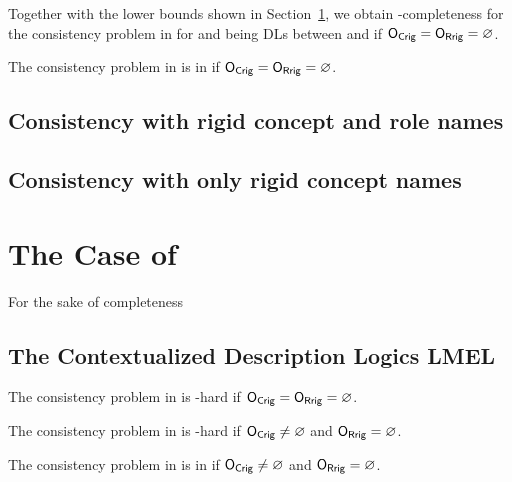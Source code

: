 Together with the lower bounds shown in Section~\ref{sec:case-el}, we obtain \ExpTime-completeness
for the consistency problem in \LMLO for \LM and \LO being DLs between \ALC and \SHOQ if
$\mathsf{O_{Crig}}=\mathsf{O_{Rrig}}=\varnothing$.

\begin{lemma}\label{lem:shoiqshoiq-without-rigid-exptime}
  The consistency problem in \SHOIQSHOIQ is in \NExpTime if $\mathsf{O_{Crig}}=\mathsf{O_{Rrig}}=\varnothing$.
\end{lemma}
\missingproof

\subsection{Consistency with rigid concept and role names}
\label{sec:cons-with-rigid}




\subsection{Consistency with only rigid concept names}
\label{sec:cons-with-only}



\section{The Case of \EL}
\label{sec:case-el}

For the sake of completeness 

\subsection{The Contextualized Description Logics LMEL}
\label{sec:con-dl-lm-el}

\begin{theorem}
  The consistency problem in \condl{\ALC}{\EL} is \ExpTime-hard if $\mathsf{O_{Crig}} = \mathsf{O_{Rrig}} = \varnothing$.
\end{theorem}
\missingproof

\begin{theorem}
  The consistency problem in \condl{\ALC}{\EL} is \NExpTime-hard if $\mathsf{O_{Crig}} \neq \varnothing$ and
  $\mathsf{O_{Rrig}} = \varnothing$.
\end{theorem}
\missingproof

\begin{theorem}
  The consistency problem in \condl{\SHOQ}{\EL} is in \NExpTime if $\mathsf{O_{Crig}} \neq \varnothing$ and
  $\mathsf{O_{Rrig}} = \varnothing$.
\end{theorem}
\missingproof

